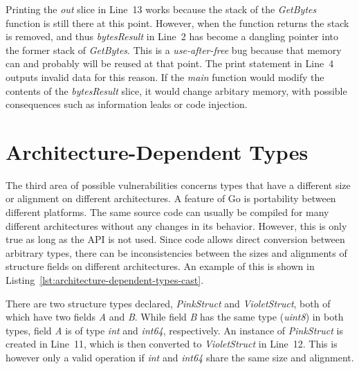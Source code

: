Printing the \textit{out} slice in Line~13 works because the stack of the \textit{GetBytes} function is still there at
this point.
However, when the function returns the stack is removed, and thus \textit{bytesResult} in Line~2 has become a dangling
pointer into the former stack of \textit{GetBytes}.
This is a \textit{use-after-free} bug because that memory can and probably will be reused at that point.
The print statement in Line~4 outputs invalid data for this reason.
If the \textit{main} function would modify the contents of the \textit{bytesResult} slice, it would change arbitary
memory, with possible consequences such as information leaks or code injection.



\section{Architecture-Dependent Types}\label{sec:unsafe-security-problems:architecture-dependent-types}

The third area of possible vulnerabilities concerns types that have a different size or alignment on different
architectures.
A feature of Go is portability between different platforms.
The same source code can usually be compiled for many different architectures without any changes in its behavior.
However, this is only true as long as the \unsafe{} \acrshort{API} is not used.
Since \unsafe{} code allows direct conversion between arbitrary types, there can be inconsistencies between the sizes
and alignments of structure fields on different architectures.
An example of this is shown in Listing~\ref{lst:architecture-dependent-types-cast}.



There are two structure types declared, \textit{PinkStruct} and \textit{VioletStruct}, both of which have two fields
\textit{A} and \textit{B}.
While field \textit{B} has the same type (\textit{uint8}) in both types, field \textit{A} is of type \textit{int} and
\textit{int64}, respectively.
An instance of \textit{PinkStruct} is created in Line~11, which is then converted to \textit{VioletStruct} in Line~12.
This is however only a valid operation if \textit{int} and \textit{int64} share the same size and alignment.

